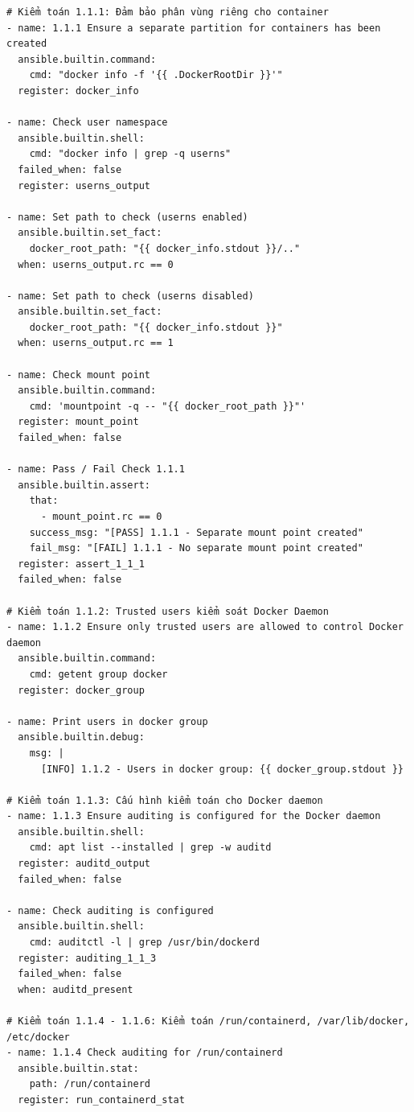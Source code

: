 {\footnotesize
\begin{verbatim}
# Kiểm toán 1.1.1: Đảm bảo phân vùng riêng cho container
- name: 1.1.1 Ensure a separate partition for containers has been created
  ansible.builtin.command:
    cmd: "docker info -f '{{ .DockerRootDir }}'"
  register: docker_info

- name: Check user namespace
  ansible.builtin.shell:
    cmd: "docker info | grep -q userns"
  failed_when: false
  register: userns_output

- name: Set path to check (userns enabled)
  ansible.builtin.set_fact:
    docker_root_path: "{{ docker_info.stdout }}/.."
  when: userns_output.rc == 0

- name: Set path to check (userns disabled)
  ansible.builtin.set_fact:
    docker_root_path: "{{ docker_info.stdout }}"
  when: userns_output.rc == 1

- name: Check mount point
  ansible.builtin.command:
    cmd: 'mountpoint -q -- "{{ docker_root_path }}"'
  register: mount_point
  failed_when: false

- name: Pass / Fail Check 1.1.1
  ansible.builtin.assert:
    that:
      - mount_point.rc == 0
    success_msg: "[PASS] 1.1.1 - Separate mount point created"
    fail_msg: "[FAIL] 1.1.1 - No separate mount point created"
  register: assert_1_1_1
  failed_when: false

# Kiểm toán 1.1.2: Trusted users kiểm soát Docker Daemon
- name: 1.1.2 Ensure only trusted users are allowed to control Docker daemon
  ansible.builtin.command:
    cmd: getent group docker
  register: docker_group

- name: Print users in docker group
  ansible.builtin.debug:
    msg: |
      [INFO] 1.1.2 - Users in docker group: {{ docker_group.stdout }}

# Kiểm toán 1.1.3: Cấu hình kiểm toán cho Docker daemon
- name: 1.1.3 Ensure auditing is configured for the Docker daemon
  ansible.builtin.shell:
    cmd: apt list --installed | grep -w auditd
  register: auditd_output
  failed_when: false

- name: Check auditing is configured
  ansible.builtin.shell:
    cmd: auditctl -l | grep /usr/bin/dockerd
  register: auditing_1_1_3
  failed_when: false
  when: auditd_present

# Kiểm toán 1.1.4 - 1.1.6: Kiểm toán /run/containerd, /var/lib/docker, /etc/docker
- name: 1.1.4 Check auditing for /run/containerd
  ansible.builtin.stat:
    path: /run/containerd
  register: run_containerd_stat


\end{verbatim}}
